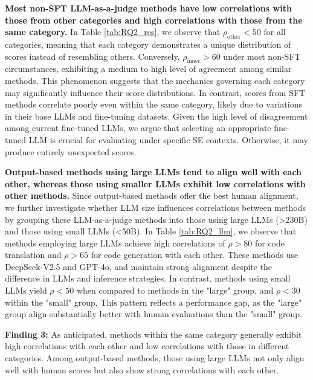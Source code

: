 \textbf{Most non-SFT LLM-as-a-judge methods have low correlations with those from other categories and high correlations with those from the same category.} In Table \ref{tab:RQ2_res}, we observe that \(\rho_\text{other}<50\) for all categories, meaning that each category demonstrates a unique distribution of scores instead of resembling others. Conversely, \(\rho_\text{inner}>60\) under most non-SFT circumstances, exhibiting a medium to high level of agreement among similar methods. This phenomenon suggests that the mechanics governing each category may significantly influence their score distributions. In contrast, scores from SFT methods correlate poorly even within the same category, likely due to variations in their base LLMs and fine-tuning datasets. Given the high level of disagreement among current fine-tuned LLMs, we argue that selecting an appropriate fine-tuned LLM is crucial for evaluating under specific SE contexts. Otherwise, it may produce entirely unexpected scores. 

\textbf{Output-based methods using large LLMs tend to align well with each other, whereas those using smaller LLMs exhibit low correlations with other methods.} Since output-based methods offer the best human alignment, we further investigate whether LLM size influences correlations between methods by grouping these LLM-as-a-judge methods into those using large LLMs (>230B) and those using small LLMs (<50B). In Table \ref{tab:RQ2_llm}, we observe that methods employing large LLMs achieve high correlations of \(\rho>80\) for code translation and \(\rho>65\) for code generation with each other. These methods use DeepSeek-V2.5 and GPT-4o, and maintain strong alignment despite the difference in LLMs and inference strategies. In contrast, methods using small LLMs yield \(\rho<50\) when compared to methods in the "large" group, and \(\rho<30\) within the "small" group. This pattern reflects a performance gap, as the "large" group align substantially better with human evaluations than the "small" group.

\vspace*{6pt}
\begin{leftbar}
\textbf{Finding 3:} As anticipated, methods within the same category generally exhibit high correlations with each other and low correlations with those in different categories. Among output-based methods, those using large LLMs not only align well with human scores but also show strong correlations with each other.
\end{leftbar}
\vspace*{6pt}

